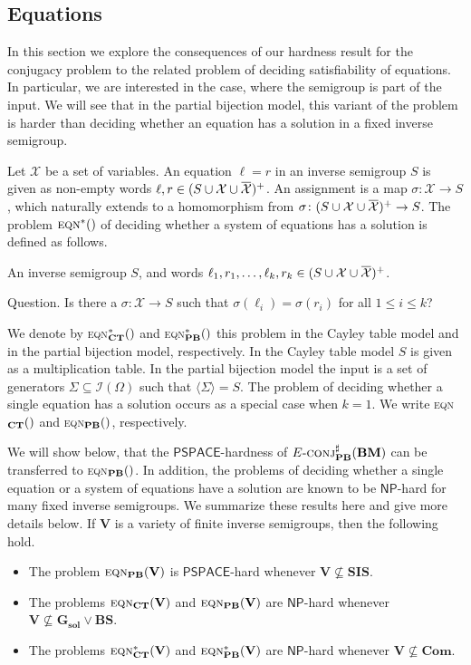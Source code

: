 \documentclass[anonymous,letter,UKenglish,cleveref,autoref,thm-restate]{lipics-v2021}
\makeatletter
\renewcommand{\leq}{\leqslant}
\renewcommand{\le}{\leq}
\newcommand{\gen}[1]{\langle #1 \rangle}
\newcommand{\NP}{\ensuremath{\mathsf{NP}}\xspace}
\newcommand{\PSPACE}{\ensuremath{\mathsf{PSPACE}}\xspace}
\newcommand{\vV}{\ensuremath{\mathbf{V}}}
\newcommand{\vGSol}{\ensuremath{\mathbf{G_{\text{sol}}}}}
\newcommand{\vSI}{\ensuremath{\mathbf{SIS}}}
\newcommand{\vCom}{\ensuremath{\mathbf{Com}}}
\newcommand{\vBS}{\ensuremath{\mathbf{BS}}}  \newcommand{\vBM}{\ensuremath{\mathbf{BM}}}
\newcommand{\ISym}{\cI}
\newcommand\nindent{.5pt}
\newcommand\noverline[1]{\kern\nindent\overline{\kern-\nindent#1\kern-\nindent}\kern\nindent}
\newcommand{\ov}[1]{\noverline{#1}}
\newcommand{\cI}{\mathcal{I}}
\newcommand{\cX}{\mathcal{X}}
\theoremstyle{plain}
\theoremstyle{plain}
\providecommand\iitem{}
\providecommand\qitem{}
\newcommand\decproblem@iitem@label{\rlap{Input.}\phantom{Question.}}
\newcommand\decproblem@qitem@label{Question.}
\newenvironment{decproblem}{\begin{description}\begin{samepage}\renewcommand{\iitem}{\item[\decproblem@iitem@label]}\renewcommand{\qitem}{\item[\decproblem@qitem@label]}}{\end{samepage}\end{description}}
\newcommand{\dConjS}[2][]{\textup{\textsc{conj${}^{\sharp}_{\mathbf{#1}}\expandafter\ifx\expandafter\relax\detokenize{#2}\relax\else(#2)\fi$}}}
\newcommand{\dEqn}[2][]{\textup{\textsc{eqn${}_{\mathbf{#1}}\expandafter\ifx\expandafter\relax\detokenize{#2}\relax\else(#2)\fi$}}}
\newcommand{\dEqnSys}[2][]{\textup{\textsc{eqn${}^\ast_{\mathbf{#1}}\expandafter\ifx\expandafter\relax\detokenize{#2}\relax\else(#2)\fi$}}}
\newcommand{\dEConjS}[2][]{\ensuremath{E}\textnormal{-}\dConjS[#1]{#2}}
\makeatother
\begin{document}
\subsection{Equations}

In this section we explore the consequences of our hardness result for the conjugacy problem to the related problem of deciding satisfiability of equations.
In particular, we are interested in the case, where the semigroup is part of the input.
We will see that in the partial bijection model, this variant of the problem is harder than deciding whether an equation has a solution in a fixed inverse semigroup.

Let $\cX$ be a set of variables.
An equation $\ell = r$ in an inverse semigroup $S$ is given as non-empty words $\ell, r \in (S \cup \cX \cup \ov \cX)^+$.
An assignment is a map $\sigma\colon \cX \to S$, which naturally extends to a homomorphism from $\sigma\colon (S \cup \cX \cup \ov \cX)^+ \to S$.
The problem $\dEqnSys{}$ of deciding whether a system of equations has a solution is defined as follows.

\begin{decproblem}
	\iitem An inverse semigroup $S$, and words $\ell_1, r_1, \ldots, \ell_k, r_k \in (S \cup \cX \cup \ov \cX)^+$.
	\qitem Is there a $\sigma\colon \cX \to S$ such that $\sigma(\ell_i) = \sigma(r_i)$ for all $1 \le i \le k$?
\end{decproblem}

We denote by \dEqnSys[CT]{} and \dEqnSys[PB]{} this problem in the Cayley table model and in the partial bijection model, respectively.
In the Cayley table model $S$ is given as a multiplication table.
In the partial bijection model the input is a set of generators $\Sigma \subseteq \ISym(\Omega)$ such that $\gen{\Sigma} = S$.
The problem of deciding whether a single equation has a solution occurs as a special case when $k = 1$.
We write \dEqn[CT]{} and \dEqn[PB]{}, respectively.

We will show below, that the $\PSPACE$-hardness of $\dEConjS[PB]{\vBM}$ can be transferred to \dEqn[PB]{}.
In addition, the problems of deciding whether a single equation or a system of equations have a solution are known to be $\NP$-hard for many fixed inverse semigroups.
We summarize these results here and give more details below.
If $\vV$ is a variety of finite inverse semigroups, then the following hold.
\begin{itemize}
  \item The problem $\dEqn[PB]{\vV}$ is $\PSPACE$-hard whenever $\vV \not\subseteq \vSI$.
  \item The problems $\dEqn[CT]{\vV}$ and $\dEqn[PB]{\vV}$ are $\NP$-hard whenever $\vV \not\subseteq \vGSol \vee \vBS$.
  \item The problems $\dEqnSys[CT]{\vV}$ and $\dEqnSys[PB]{\vV}$ are $\NP$-hard whenever $\vV \not\subseteq \vCom$.
\end{itemize}
\end{document}
